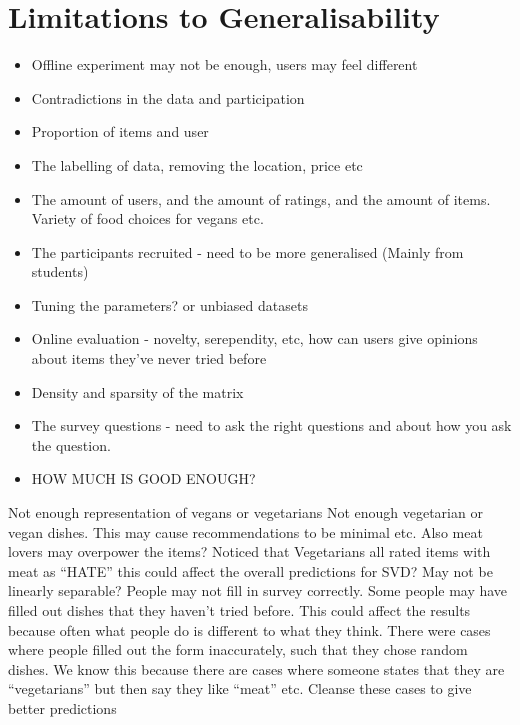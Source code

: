 \section{Limitations to Generalisability}

\begin{itemize}
	\item{Offline experiment may not be enough, users may feel different}
	\item{Contradictions in the data and participation}
	\item{Proportion of items and user}
	\item{The labelling of data, removing the location, price etc}
	\item{The amount of users, and the amount of ratings, and the amount of items. Variety of food choices for vegans etc. }
	\item{The participants recruited - need to be more generalised (Mainly from students)}
	\item{Tuning the parameters? or unbiased datasets}
	\item{Online evaluation - novelty, serependity, etc, how can users give opinions about items they've never tried before}
	\item{Density and sparsity of the matrix}
	\item{The survey questions - need to ask the right questions and about how you ask the question.}
	\item{HOW MUCH IS GOOD ENOUGH?}
\end{itemize}
Not enough representation of vegans or vegetarians
Not enough vegetarian or vegan dishes. 
This may cause recommendations to be minimal etc.
Also meat lovers may overpower the items?
Noticed that Vegetarians all rated items with meat as “HATE” this could affect the overall predictions for SVD?
May not be linearly separable?
People may not fill in survey correctly.
Some people may have filled out dishes that they haven't tried before. This could affect the results because often what people do is different to what they think. 
There were cases where people filled out the form inaccurately, such that they chose random dishes. We know this because there are cases where someone states that they are “vegetarians” but then say they like “meat” etc.
Cleanse these cases to give better predictions

